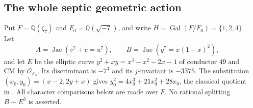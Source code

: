 
\subsection{The whole septic geometric action}

Put $F=\mathbb Q(\zeta_7)$ and $F_0=\mathbb Q(\sqrt{-7})$,
and write $H=\operatorname{Gal}(F/F_0)=\{1,2,4\}$.
Let
\[
 A=\operatorname{Jac}(v^2+v=u^7),\qquad
 B=\operatorname{Jac}(y^7=x(1-x)^2),
\]
and let $E$ be the elliptic curve
$y^2+xy=x^3-x^2-2x-1$ of conductor $49$ and CM by
$\mathcal O_{F_0}$.  Its discriminant is $-7^3$ and
its $j$-invariant is $-3375$.
The substitution $(x_0,y_0)=(x-2,2y+x)$ gives
$y_0^2=4x_0^3+21x_0^2+28x_0$, the classical quotient in
\citet[Eq.~(2.10), pp.~68--69]{Elkies1998}.
All character comparisons below are made over $F$.
No rational splitting $B\sim E^3$ is asserted.

